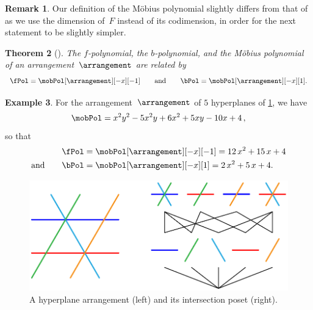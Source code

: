 \documentclass{amsart}
\newtheorem{theorem}{Theorem}[section]
\theoremstyle{definition}
\newtheorem{example}[theorem]{Example}
\newtheorem{remark}[theorem]{Remark}
\begin{document}
\begin{remark}
Our definition of the M\"obius polynomial slightly differs from that of \cite{Zaslavsky} as we use the dimension of~$F$ instead of its codimension, in order for the next statement to be slightly simpler.
\end{remark}

\begin{theorem}[{\cite[Thm.~A]{Zaslavsky}}]
\label{thm:Zaslavsky}
The $f$-polynomial, the $b$-polynomial, and the M\"obius polynomial of an arrangement~$\arrangement$ are related by
\[
\fPol = \mobPol[\arrangement][-x][-1]
\qquad\text{and}\qquad
\bPol = \mobPol[\arrangement][-x][1].
\]
\end{theorem}

\begin{example}
For the arrangement~$\arrangement$ of $5$ hyperplanes of \cref{fig:arrangement}, we have
\[
\mobPol = x^2y^2 - 5x^2y + 6x^2 + 5xy - 10x + 4 \, ,
\]
so that
\begin{align*}
\fPol & = \mobPol[\arrangement][-x][-1] = 12 \, x^2 + 15 \, x + 4 \\
\text{and}\qquad
\bPol & = \mobPol[\arrangement][-x][1] = 2 \, x^2 + 5 \, x + 4.
\end{align*}
%
\begin{figure}
	\includegraphics[scale=.9]{intersectionPoset}
	\caption{A hyperplane arrangement (left) and its intersection poset (right).}
	\label{fig:arrangement}
\end{figure}
\end{example}
\end{document}
